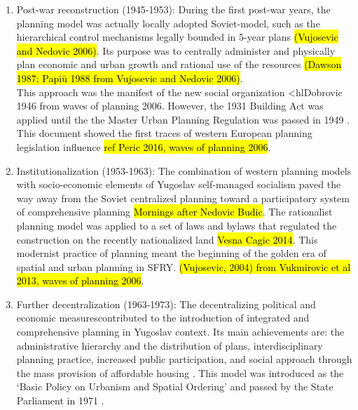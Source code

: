 \documentclass[11pt]{report}
\begin{document}
\begin{enumerate}
\item Post-war reconstruction (1945-1953):
During the first post-war years, the planning model was actually locally adopted Soviet-model, such as the hierarchical  control  mechanisms legally bounded in 5-year plans \hl{(Vujosevic and Nedovic 2006)}.
Its purpose was to centrally administer and physically plan economic and urban growth and rational use of the resources \hl{(Dawson  1987; Papiü 1988 from Vujosevic and Nedovic 2006)}. 
\\
This approach was the manifest of the new social organization <hl{Dobrovic 1946 from waves of planning 2006}. However, the 1931 Building Act was applied until the the Master Urban Planning Regulation was passed in 1949 \cite{waves of planning 2006}. This document showed the first traces of western European planning legislation influence \hl{ref Peric 2016, waves of planning 2006}.

\item Institutionalization (1953-1963):
The combination of western planning models with socio-economic elements of
Yugoslav self-managed socialism paved the way away from the Soviet centralized planning toward a participatory system of comprehensive planning
\hl{Mornings after Nedovic Budic}. The rationalist planning model was applied to a set of laws and bylaws that regulated the construction on the recently nationalized land \hl{Vesna Cagic 2014}. This modernist practice of planning meant the beginning of the golden era of spatial and urban planning in SFRY.
\hl{(Vujosevic, 2004) from Vukmirovic et al 2013, waves of planning 2006}.

\item Further decentralization (1963-1973):
The decentralizing political and economic measures\footnotemark contributed to the introduction of integrated and comprehensive planning in Yugoslav context. Its main achievements are: the administrative hierarchy  and the distribution of plans, interdisciplinary planning practice, increased public participation, and social approach through the mass provision of affordable housing \cite{Vesna Cagic 2014, Peric 2016}.
This model was introduced as the ‘Basic Policy on Urbanism and Spatial Ordering’ and passed by the State Parliament in 1971 \cite{waves of planning 2006}.


\end{enumerate}
\end{document}
